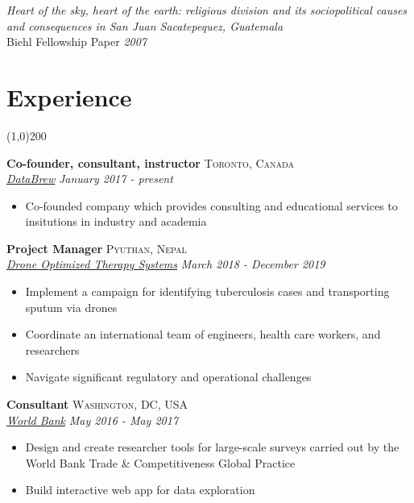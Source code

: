 \documentclass[11pt]{article}
\begin{document}
\noindent \emph{Heart of the sky, heart of the earth: religious division and its sociopolitical causes and consequences in San Juan Sacatepequez, Guatemala} \\ Biehl Fellowship Paper \hfill \emph{2007}\\

\newpage

\section*{Experience} %
\vspace{-7mm}
\line(1,0){200}
\vspace{2mm}

\noindent \textbf{Co-founder, consultant, instructor} \hfill \textsc{Toronto, Canada}\\
\noindent \emph{\href{www.databrew.cc}{DataBrew}} \hfill \emph{January 2017 - present}
\vspace{-2mm}
\begin{itemize}\itemsep0pt \parskip0pt 
\item Co-founded company which provides consulting and educational services to insitutions in industry and academia
\end{itemize}

\noindent \textbf{Project Manager} \hfill \textsc{Pyuthan, Nepal}\\
\noindent \emph{\href{http://droneots.com/}{Drone Optimized Therapy Systems}} \hfill \emph{March 2018 - December 2019}
\vspace{-2mm}
\begin{itemize}\itemsep0pt \parskip0pt 
\item Implement a campaign for identifying tuberculosis cases and transporting sputum via drones
\item Coordinate an international team of engineers, health care workers, and researchers
\item Navigate significant regulatory and operational challenges 
\end{itemize}


\noindent \textbf{Consultant} \hfill \textsc{Washington, DC, USA}\\
\noindent \emph{\href{http://www.worldbank.org/}{World Bank}} \hfill \emph{May 2016 - May 2017}
\vspace{-2mm}
\begin{itemize}\itemsep0pt \parskip0pt 
\item Design and create researcher tools for large-scale surveys carried out by the World Bank Trade & Competitiveness Global Practice
\item Build interactive web app for data exploration
\end{itemize}
\end{document}
